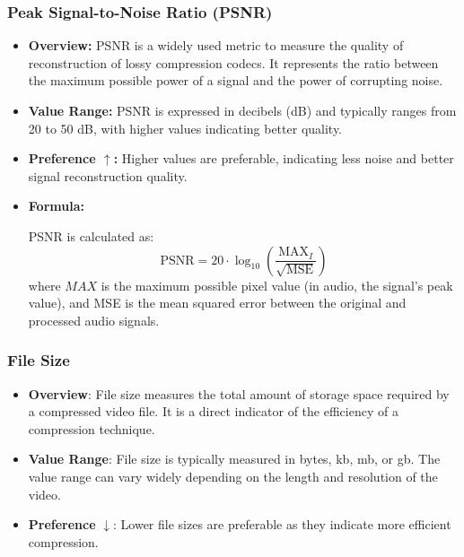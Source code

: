 \documentclass{ioereport}
\begin{document}
\subsubsection{Peak Signal-to-Noise Ratio (PSNR)}
\begin{itemize}
    \item \textbf{Overview:} PSNR is a widely used metric to measure the quality of reconstruction of lossy compression codecs. It represents the ratio between the maximum possible power of a signal and the power of corrupting noise.
    
    \item \textbf{Value Range:} PSNR is expressed in decibels (dB) and typically ranges from 20 to 50 dB, with higher values indicating better quality.
    
    \item \textbf{Preference $\uparrow$:} Higher values are preferable, indicating less noise and better signal reconstruction quality.
    
    \item \textbf{Formula:}
    
    PSNR is calculated as:
    \begin{equation}
        \text{PSNR} = 20 \cdot \log_{10}\left(\frac{{\text{MAX}_I}}{\sqrt{\text{MSE}}}\right)
    \end{equation}
    where \( MAX \) is the maximum possible pixel value (in audio, the signal's peak value), and MSE is the mean squared error between the original and processed audio signals.
\end{itemize}

\subsubsection{File Size}
            \begin{itemize}
                \item \textbf{Overview}: File size measures the total amount of storage space required by a compressed video file. It is a direct indicator of the efficiency of a compression technique.
                \item \textbf{Value Range}: File size is typically measured in bytes, \gls{kb}, \gls{mb}, or \gls{gb}. The value range can vary widely depending on the length and resolution of the video.
                \item \textbf{Preference} $\downarrow$: Lower file sizes are preferable as they indicate more efficient compression.
            \end{itemize}
\end{document}
